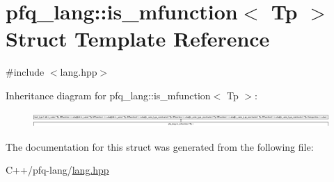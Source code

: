 \hypertarget{structpfq__lang_1_1is__mfunction}{\section{pfq\+\_\+lang\+:\+:is\+\_\+mfunction$<$ Tp $>$ Struct Template Reference}
\label{structpfq__lang_1_1is__mfunction}
}


{\ttfamily \#include $<$lang.\+hpp$>$}

Inheritance diagram for pfq\+\_\+lang\+:\+:is\+\_\+mfunction$<$ Tp $>$\+:\begin{figure}[H]
\begin{center}
\leavevmode
\includegraphics[height=0.570846cm]{structpfq__lang_1_1is__mfunction}
\end{center}
\end{figure}


The documentation for this struct was generated from the following file\+:\begin{DoxyCompactItemize}
\item 
C++/pfq-\/lang/\hyperlink{lang_8hpp}{lang.\+hpp}\end{DoxyCompactItemize}
